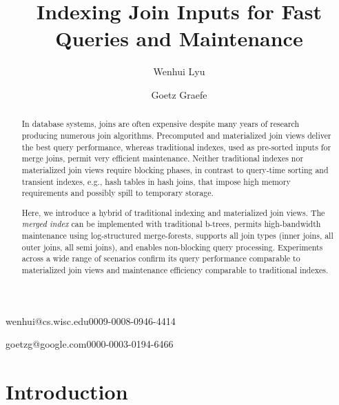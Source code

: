 \documentclass[biblatex, english]{lni}
\begin{document}
\title[Indexing Join Inputs]{Indexing Join Inputs for Fast Queries and Maintenance}
\author[1]{Wenhui Lyu}{wenhui@cs.wisc.edu}{0009-0008-0946-4414}
\author[2]{Goetz Graefe}{goetzg@google.com}{0000-0003-0194-6466}
\maketitle

\begin{abstract} %
    In database systems, joins are often expensive despite many years of research producing numerous join algorithms.
    Precomputed and materialized join views deliver the best query performance, whereas traditional indexes, used as pre-sorted inputs for merge joins, permit very efficient maintenance.
    Neither traditional indexes nor materialized join views require blocking phases, in contrast to query-time sorting and transient indexes, e.g., hash tables in hash joins, that impose high memory requirements and possibly spill to temporary storage.

    Here, we introduce a hybrid of traditional indexing and materialized join views.
    The \textit{merged index} can be implemented with traditional b-trees, permits high-bandwidth maintenance using log-structured merge-forests, supports all join types (inner joins, all outer joins, all semi joins), and enables non-blocking query processing.
    Experiments across a wide range of scenarios confirm its query performance comparable to materialized join views and maintenance efficiency comparable to traditional indexes.
\end{abstract}


\section{Introduction}\label{sec:intro}
\end{document}
